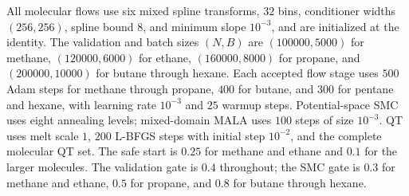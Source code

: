 \documentclass{article}
\begin{document}
All molecular flows use six mixed spline transforms, $32$ bins, conditioner widths $(256,256)$, spline bound $8$, and minimum slope $10^{-3}$, and are initialized at the identity. The validation and batch sizes $(N,B)$ are $(100000,5000)$ for methane, $(120000,6000)$ for ethane, $(160000,8000)$ for propane, and $(200000,10000)$ for butane through hexane. Each accepted flow stage uses $500$ Adam steps for methane through propane, $400$ for butane, and $300$ for pentane and hexane, with learning rate $10^{-3}$ and $25$ warmup steps. Potential-space SMC uses eight annealing levels; mixed-domain MALA uses $100$ steps of size $10^{-3}$. QT uses melt scale $1$, $200$ L-BFGS steps with initial step $10^{-2}$, and the complete molecular QT set. The safe start is $0.25$ for methane and ethane and $0.1$ for the larger molecules. The validation gate is $0.4$ throughout; the SMC gate is $0.3$ for methane and ethane, $0.5$ for propane, and $0.8$ for butane through hexane.
\end{document}
